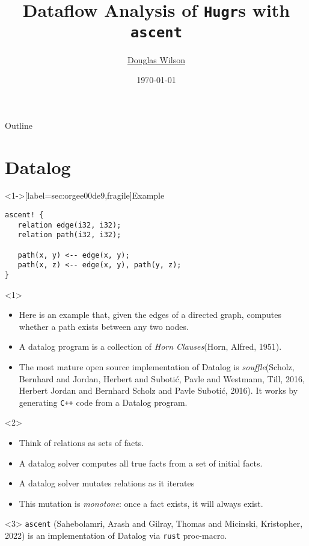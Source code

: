 \documentclass[presentation]{beamer}
\author{\href{mailto:douglas.wilson@quantinuum.com}{Douglas Wilson}}
\date{\today}
\title{Dataflow Analysis of \texttt{Hugr}​s with \texttt{ascent}}
\begin{document}
\maketitle
\begin{frame}{Outline}
\tableofcontents
\end{frame}

\section{Datalog}
\label{sec:org7223913}
\begin{frame}<1->[label={sec:orgee00de9},fragile]{Example}
 \begin{verbatim}
ascent! {
   relation edge(i32, i32);
   relation path(i32, i32);

   path(x, y) <-- edge(x, y);
   path(x, z) <-- edge(x, y), path(y, z);
}
\end{verbatim}
\begin{onlyenv}<1>
\begin{itemize}
\item Here is an example that, given the edges of a directed graph, computes whether a path exists between any two nodes.

\item A datalog program is a collection of \emph{Horn Clauses}(Horn, Alfred, 1951).

\item The most mature open source implementation of Datalog is \emph{souffle}(Scholz, Bernhard and Jordan, Herbert and Suboti\'{c}, Pavle and Westmann, Till, 2016,  Herbert Jordan and Bernhard Scholz and Pavle Suboti{\'c}, 2016). It works by generating \texttt{C++} code from a Datalog program.
\end{itemize}
\end{onlyenv}
\begin{onlyenv}<2>
\begin{itemize}
\item Think of relations as sets of facts.
\item A datalog solver computes all true facts from a set of initial facts.
\item A datalog solver mutates relations as it iterates
\item This mutation is \emph{monotone}: once a fact exists, it will always exist.
\end{itemize}
\end{onlyenv}
\begin{onlyenv}<3>
\texttt{ascent} (Sahebolamri, Arash and Gilray, Thomas and Micinski, Kristopher, 2022) is an implementation of Datalog via \texttt{rust} proc-macro.


\end{onlyenv}
\end{frame}
\end{document}
